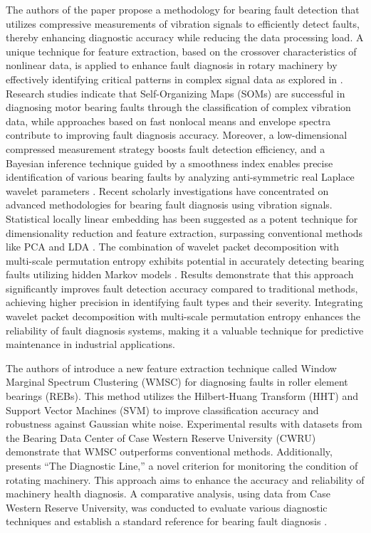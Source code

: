 \documentclass[sn-basic,pdflatex]{sn-jnl}
\theoremstyle{remark}
\theoremstyle{definition}
\begin{document}
The authors of the paper \citep{WOS:000335959500009} propose a
methodology for bearing fault detection that utilizes compressive
measurements of vibration signals to efficiently detect faults, thereby
enhancing diagnostic accuracy while reducing the data processing load. A
unique technique for feature extraction, based on the crossover
characteristics of nonlinear data, is applied to enhance fault diagnosis
in rotary machinery by effectively identifying critical patterns in
complex signal data as explored in \citep{WOS:000338603900013}. Research
studies indicate that Self-Organizing Maps (SOMs) are successful in
diagnosing motor bearing faults through the classification of complex
vibration data, while approaches based on fast nonlocal means and
envelope spectra contribute to improving fault diagnosis accuracy.
Moreover, a low-dimensional compressed measurement strategy boosts fault
detection efficiency, and a Bayesian inference technique guided by a
smoothness index enables precise identification of various bearing
faults by analyzing anti-symmetric real Laplace wavelet parameters
\citep[\citet{WOS:000348309400067}, \citet{WOS:000354607100016},
\citet{WOS:000350998800016}]{WOS:000380543400119}. Recent scholarly
investigations have concentrated on advanced methodologies for bearing
fault diagnosis using vibration signals. Statistical locally linear
embedding has been suggested as a potent technique for dimensionality
reduction and feature extraction, surpassing conventional methods like
PCA and LDA \citep{WOS:000361788200068}. The combination of wavelet
packet decomposition with multi-scale permutation entropy exhibits
potential in accurately detecting bearing faults utilizing hidden Markov
models \citep{WOS:000362513400031}. Results demonstrate that this
approach significantly improves fault detection accuracy compared to
traditional methods, achieving higher precision in identifying fault
types and their severity. Integrating wavelet packet decomposition with
multi-scale permutation entropy enhances the reliability of fault
diagnosis systems, making it a valuable technique for predictive
maintenance in industrial applications.

The authors of \citep{WOS:000365686400021} introduce a new feature
extraction technique called Window Marginal Spectrum Clustering (WMSC)
for diagnosing faults in roller element bearings (REBs). This method
utilizes the Hilbert-Huang Transform (HHT) and Support Vector Machines
(SVM) to improve classification accuracy and robustness against Gaussian
white noise. Experimental results with datasets from the Bearing Data
Center of Case Western Reserve University (CWRU) demonstrate that WMSC
outperforms conventional methods. Additionally,
\citep{WOS:000366534900022} presents ``The Diagnostic Line,'' a novel
criterion for monitoring the condition of rotating machinery. This
approach aims to enhance the accuracy and reliability of machinery
health diagnosis. A comparative analysis, using data from Case Western
Reserve University, was conducted to evaluate various diagnostic
techniques and establish a standard reference for bearing fault
diagnosis \citep{WOS:000357230900007}.
\end{document}
